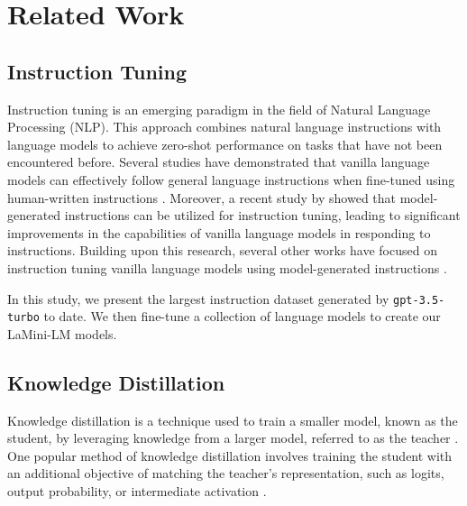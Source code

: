 \documentclass[11pt]{article}
\newcommand{\modelnamefull}{LaMini-LM\xspace}
\newcommand{\llm}[1]{\texttt{#1}\xspace}
\newcommand{\chatgpt}{\llm{gpt-3.5-turbo}}
\begin{document}
%
  


\section{Related Work}

\subsection{Instruction Tuning}

Instruction tuning is an emerging paradigm in the field of Natural Language Processing (NLP). This approach combines natural language instructions with language models to achieve zero-shot performance on tasks that have not been encountered before.
Several studies have demonstrated that vanilla language models can effectively follow general language instructions when fine-tuned using human-written instructions \cite{weller-etal-2020-learning, mishra-etal-2022-cross,wang-etal-2022-super,wei2022finetuned,DBLP:conf/iclr/SanhWRBSACSRDBX22,ouyang2022training,parmar-etal-2022-boxbart,scialom-etal-2022-fine,DBLP:journals/corr/abs-2210-11416,yin-etal-2022-contintin,gupta-etal-2022-instructdial,DBLP:journals/corr/abs-2211-01786}.
Moreover, a recent study by \citet{DBLP:journals/corr/abs-2212-10560} showed that model-generated instructions can be utilized for instruction tuning, leading to significant improvements in the capabilities of vanilla language models in responding to instructions.
Building upon this research, several other works have focused on instruction tuning vanilla language models using model-generated instructions \cite{alpaca, vicuna2023, gpt4all, phoenix-2023}.

In this study, we present the largest instruction dataset generated by \chatgpt to date. We then fine-tune a collection of language models to create our \modelnamefull models.




\subsection{Knowledge Distillation}

Knowledge distillation is a technique used to train a smaller model, known as the student, by leveraging knowledge from a larger model, referred to as the teacher  \cite{DBLP:journals/corr/HintonVD15}. One popular method of knowledge distillation involves training the student with an additional objective of matching the teacher's representation, such as logits, output probability, or intermediate activation \cite{DBLP:journals/corr/abs-1910-01108,jiao-etal-2020-tinybert,DBLP:conf/aaai/MirzadehFLLMG20,DBLP:conf/nips/WangW0B0020,DBLP:conf/cvpr/ZhaoCSQL22}.
\end{document}

